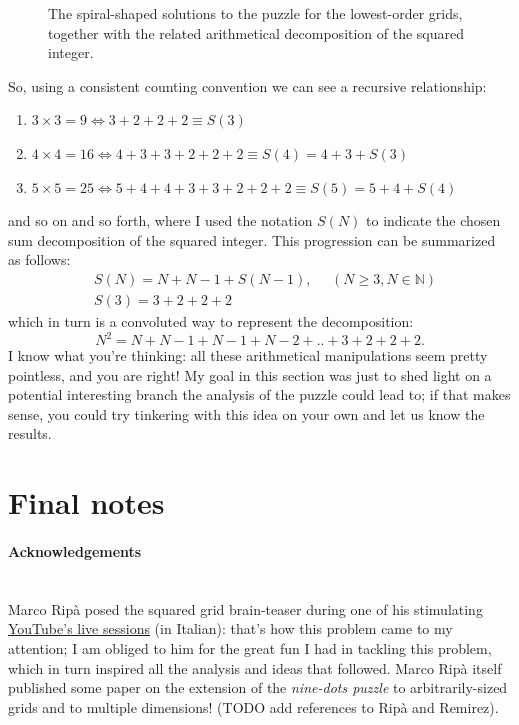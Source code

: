 \documentclass[11pt]{article}
\begin{document}
\begin{figure}

\caption{The spiral-shaped solutions to the puzzle for the lowest-order grids, together with the related arithmetical decomposition of the squared integer.}
\label{fig:solution-number-decomposition}
\end{figure}
So, using a consistent counting convention we can see a recursive relationship:\\
\begin{enumerate}
	\item[] %
		$3 \times 3 = 9 \Leftrightarrow 3 + 2 + 2 + 2 \equiv S(3)$
	\item[]
		$4 \times 4 =16 \Leftrightarrow 4 + 3+ 3 + 2 + 2 + 2 \equiv S(4) = 4 + 3 + S(3) $
	\item[]
		$5 \times 5 =25 \Leftrightarrow 5 + 4 + 4 + 3+ 3 + 2 + 2 + 2 \equiv S(5) = 5 + 4 + S(4)$
\end{enumerate}
and so on and so forth, where I used the notation $S(N)$ to indicate the chosen sum decomposition of the squared integer. This progression can be summarized as follows:
\begin{equation}
\begin{aligned}
&S(N) = N + N -1 + S(N - 1), \ \ \ \ \ \  (N \geq 3, N \in \mathbb{N})\\
&S(3) = 3 + 2 + 2 + 2
\end{aligned}
\end{equation}
which in turn is a convoluted way to represent the decomposition:
\begin{equation}
N^2 = N + N - 1 + N - 1 + N - 2 + .. + 3 + 2 + 2 + 2.
\end{equation}
I know what you're thinking: all these arithmetical manipulations seem pretty pointless, and you are right! My goal in this section was just to shed light on a potential interesting branch the analysis of the puzzle could lead to; if that makes sense, you could try tinkering with this idea on your own and let us know the results.

\hypertarget{final-notes}{
	\section{Final notes}
	\label{final-notes}
}

\paragraph{Acknowledgements} \mbox{} \\ %
Marco Ripà posed the squared grid brain-teaser during one of his stimulating \href{https://www.youtube.com/watch?v=rh-ONRXcHok}{YouTube's live sessions} (in Italian): that's how this problem came to my attention; I am obliged to him for the great fun I had in tackling this problem, which in turn inspired all the analysis and ideas that followed. Marco Ripà itself published some paper on the extension of the \emph{nine-dots puzzle} to arbitrarily-sized grids and to multiple dimensions! (TODO add references to Ripà and Remirez).
\end{document}
